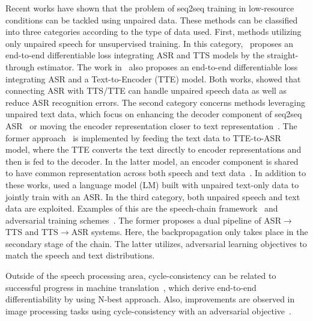 \documentclass[a4paper]{article}
\begin{document}
Recent works have shown that the problem of seq2seq training in low-resource conditions can be tackled using unpaired data. These methods can be classified into three categories according to the type of data used. First, methods utilizing only unpaired speech for unsupervised training. In this category,~\cite{tjandra2018end} proposes an end-to-end differentiable loss integrating ASR and TTS models by the straight-through estimator. The work in~\cite{hori2018cycle} also proposes an end-to-end differentiable loss integrating ASR and a Text-to-Encoder (TTE) model. Both works, showed that connecting ASR with TTS/TTE can handle unpaired speech data as well as reduce ASR recognition errors.
The second category concerns methods leveraging unpaired text data, which focus on enhancing the decoder component of seq2seq ASR~\cite{hayashi2018back} or moving the encoder representation closer to text representation~\cite{renduchintala2018multi}. The former approach~\cite{hayashi2018back} is implemented by feeding the text data to TTE-to-ASR~\cite{hayashi2018back} model, where the TTE converts the text directly to encoder representations and then is fed to the decoder. In the latter model, 
an encoder component is shared to have common representation across both speech and text data~\cite{renduchintala2018multi}. In addition to these works, \cite{liuLM} used a language model (LM) built with unpaired text-only data to jointly train with an ASR. In the third category, both unpaired speech and text data are exploited. Examples of this are the speech-chain framework~\cite{tjandra2017listening} and adversarial training schemes~\cite{drexler2018combining,karita2018sequence}. The former proposes a dual pipeline of ASR$\rightarrow$TTS and TTS$\rightarrow$ASR systems. Here, the backpropagation only takes place in the secondary stage of the chain. The latter utilizes, adversarial learning objectives to match the speech and text distributions.

Outside of the speech processing area, cycle-consistency can be related to successful progress in machine translation~\cite{he2016dual}, which derive end-to-end differentiability by using N-best approach. Also, improvements are observed in image processing tasks using cycle-consistency with an adversarial objective~\cite{zhu2017unpaired}.
\end{document}
